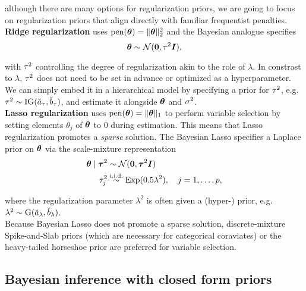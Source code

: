although there are many options for regularization priors, we are going to focus on regularization priors that align directly with familiar frequentist penalties.\\

\textbf{Ridge regularization} \citep{hoerl_ridge_1970,hoerl_ridge_1970-1} uses $\text{pen}(\bm{\theta}) = \|\bm{\theta}\|_2^2$ and the Bayesian analogue  specifies
\begin{equation*}
    \bm{\theta} \sim \mathcal{N}(\bm{0}, \tau^2 \bm{I}),
\end{equation*}

with $\tau^2$ controlling the degree of regularization akin to the role of $\lambda$.
In constrast to $\lambda$, $\tau^2$ does not need to be set in advance or optimized as a hyperparameter.
We can simply embed it in a hierarchical model by specifying a prior for $\tau^2$, e.g. $\tau^2 \sim \text{IG}(\breve{a}_\tau, \breve{b}_\tau)$, and estimate it alongside $\bm{\theta}$ and $\sigma^2$.\\

\textbf{Lasso regularization} \citep{tibshirani_regression_1996} uses $\text{pen}(\bm{\theta}) = \|\bm{\theta}\|_1$ to perform variable selection by setting elements $\theta_j$ of $\bm{\theta}$ to $0$ during estimation.
This means that Lasso regularization promotes a \textit{sparse} solution.
The Bayesian Lasso specifies a Laplace prior on $\bm{\theta}$ via the scale-mixture representation \citep{park_bayesian_2008}
\begin{equation}
    \begin{aligned}
        \bm{\theta} \mid \bm{\tau}^2 &\sim \mathcal{N}(\bm{0}, \bm{\tau}^2 \bm{I}) \\
        \tau^2_j &\overset{\text{i.i.d.}}{\sim} \text{Exp}(0.5 \lambda^2), \quad j = 1, \dots, p,
    \end{aligned}
\end{equation}

where the regularization parameter $\lambda^2$ is often given a (hyper-) prior, e.g. $\lambda^2 \sim \text{G}(\breve{a}_\lambda, \breve{b}_\lambda)$.\\

Because Bayesian Lasso does not promote a sparse solution, discrete-mixture Spike-and-Slab priors \citep{mitchell_bayesian_1988} (which are necessary for categorical coraviates) or the heavy-tailed horseshoe prior \citep{carvalho_horseshoe_2010} are preferred for variable selection.

\subsection{Bayesian inference with closed form priors}

